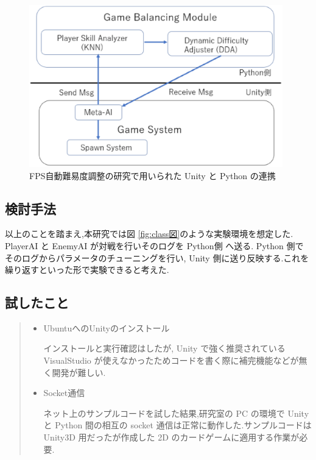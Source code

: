 \documentclass{jarticle}     %
\begin{document}
\begin{figure}[htbp]
  \centering
  \includegraphics[width=110mm]{assets/Figure3.eps}
  \caption{FPS自動難易度調整の研究で用いられた Unity と Python の連携}
  \label{fig:Unity}
\end{figure}

\subsection{検討手法}
以上のことを踏まえ,本研究では図 \ref{fig:class図}のような実験環境を想定した.
PlayerAI と EnemyAI が対戦を行いそのログを Python側 へ送る. Python 側でそのログからパラメータのチューニングを行い, Unity 側に送り反映する.これを繰り返すといった形で実験できると考えた.

\subsection{試したこと}

\begin{quote}
  \begin{itemize}
   \item UbuntuへのUnityのインストール
   \par
   インストールと実行確認はしたが, Unity で強く推奨されている VisualStudio が使えなかったためコードを書く際に補完機能などが無く開発が難しい.
   \item Socket通信
   \par 
   ネット上のサンプルコード\cite{サンプルコード}を試した結果,研究室の PC の環境で Unity と Python 間の相互の socket 通信は正常に動作した.サンプルコードは Unity3D 用だったが作成した 2D のカードゲームに適用する作業が必要.
  \end{itemize}
 \end{quote}
\end{document}
